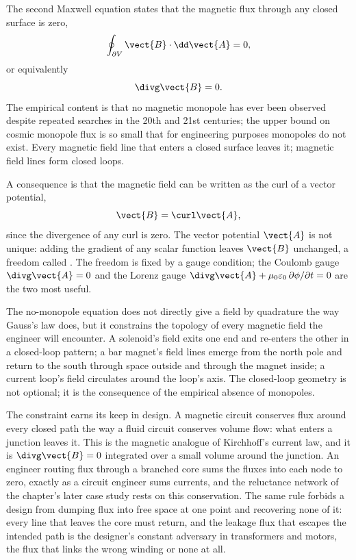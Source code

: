 The second Maxwell equation states that the magnetic flux through any
closed surface is zero,
\[
\oint_{\partial V} \vect{B}\cdot \dd\vect{A} = 0,
\]
or equivalently
\[
\divg \vect{B} = 0.
\]
The empirical content is that no magnetic monopole has ever been
observed despite repeated searches in the 20th and 21st centuries; the
upper bound on cosmic monopole flux is so small that for engineering
purposes monopoles do not exist. Every magnetic field line that enters
a closed surface leaves it; magnetic field lines form closed loops.

A consequence is that the magnetic field can be written as the curl of
a vector potential,
\[
\vect{B} = \curl \vect{A},
\]
since the divergence of any curl is zero. The vector potential
$\vect{A}$ is not unique: adding the gradient of any scalar function
leaves $\vect{B}$ unchanged, a freedom called . The freedom is fixed by a gauge condition; the Coulomb
gauge $\divg \vect{A} = 0$ and the Lorenz gauge $\divg \vect{A} +
\mu_{0}\varepsilon_{0}\,\partial \phi/\partial t = 0$ are the two
most useful.

The no-monopole equation does not directly give a field by quadrature
the way Gauss's law does, but it constrains the topology of every
magnetic field the engineer will encounter. A solenoid's field exits
one end and re-enters the other in a closed-loop pattern; a bar
magnet's field lines emerge from the north pole and return to the
south through space outside and through the magnet inside; a current
loop's field circulates around the loop's axis. The closed-loop
geometry is not optional; it is the consequence of the empirical
absence of monopoles.

The constraint earns its keep in design. A magnetic circuit conserves
flux around every closed path the way a fluid circuit conserves volume
flow: what enters a junction leaves it. This is the magnetic analogue of
Kirchhoff's current law, and it is $\divg\vect{B} = 0$ integrated over a
small volume around the junction. An engineer routing flux through a
branched core sums the fluxes into each node to zero, exactly as a
circuit engineer sums currents, and the reluctance network of the
chapter's later case study rests on this conservation. The same rule
forbids a design from dumping flux into free space at one point and
recovering none of it: every line that leaves the core must return, and
the leakage flux that escapes the intended path is the designer's
constant adversary in transformers and motors, the flux that links the
wrong winding or none at all.

